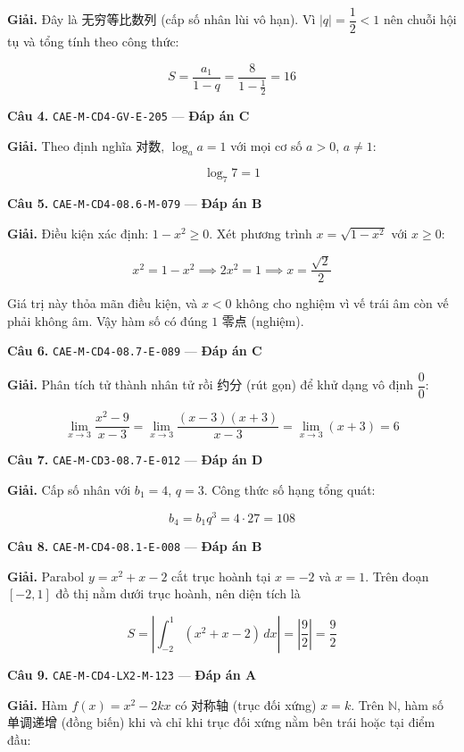 \documentclass[11pt, a4paper]{article}
\begin{document}
\textbf{Giải.} Đây là 无穷等比数列 (cấp số nhân lùi vô hạn). Vì $\lvert q \rvert = \dfrac{1}{2} < 1$ nên chuỗi hội tụ và tổng tính theo công thức:

$$S = \frac{a_1}{1 - q} = \frac{8}{1 - \frac{1}{2}} = 16$$

\textbf{Câu 4.} \texttt{CAE-M-CD4-GV-E-205} — \textbf{Đáp án C}

\textbf{Giải.} Theo định nghĩa 对数, $\log_a a = 1$ với mọi cơ số $a > 0$, $a \ne 1$:

$$\log_7 7 = 1$$

\textbf{Câu 5.} \texttt{CAE-M-CD4-08.6-M-079} — \textbf{Đáp án B}

\textbf{Giải.} Điều kiện xác định: $1 - x^2 \ge 0$. Xét phương trình $x = \sqrt{1 - x^2}$ với $x \ge 0$:

$$x^2 = 1 - x^2 \implies 2x^2 = 1 \implies x = \frac{\sqrt{2}}{2}$$

Giá trị này thỏa mãn điều kiện, và $x < 0$ không cho nghiệm vì vế trái âm còn vế phải không âm. Vậy hàm số có đúng $1$ 零点 (nghiệm).

\textbf{Câu 6.} \texttt{CAE-M-CD4-08.7-E-089} — \textbf{Đáp án C}

\textbf{Giải.} Phân tích tử thành nhân tử rồi 约分 (rút gọn) để khử dạng vô định $\dfrac{0}{0}$:

$$\lim_{x \to 3} \frac{x^2 - 9}{x - 3} = \lim_{x \to 3} \frac{(x - 3)(x + 3)}{x - 3} = \lim_{x \to 3}(x + 3) = 6$$

\textbf{Câu 7.} \texttt{CAE-M-CD3-08.7-E-012} — \textbf{Đáp án D}

\textbf{Giải.} Cấp số nhân với $b_1 = 4$, $q = 3$. Công thức số hạng tổng quát:

$$b_4 = b_1 q^3 = 4 \cdot 27 = 108$$

\textbf{Câu 8.} \texttt{CAE-M-CD4-08.1-E-008} — \textbf{Đáp án B}

\textbf{Giải.} Parabol $y = x^2 + x - 2$ cắt trục hoành tại $x = -2$ và $x = 1$. Trên đoạn $[-2, 1]$ đồ thị nằm dưới trục hoành, nên diện tích là

$$S = \left\lvert \int_{-2}^{1}(x^2 + x - 2)\,dx \right\rvert = \left\lvert \frac{9}{2} \right\rvert = \frac{9}{2}$$

\textbf{Câu 9.} \texttt{CAE-M-CD4-LX2-M-123} — \textbf{Đáp án A}

\textbf{Giải.} Hàm $f(x) = x^2 - 2kx$ có 对称轴 (trục đối xứng) $x = k$. Trên $\mathbb{N}$, hàm số 单调递增 (đồng biến) khi và chỉ khi trục đối xứng nằm bên trái hoặc tại điểm đầu:
\end{document}
